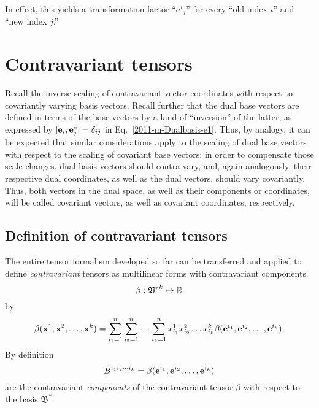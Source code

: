 In effect, this yields a transformation factor ``${a^i}_j$'' for every ``old index $i$'' and ``new index $j$.''



\section{Contravariant tensors}

Recall the inverse scaling of contravariant vector coordinates with respect to covariantly varying basis vectors.
Recall further that the dual base vectors are defined in terms of the base vectors by
a kind of ``inversion'' of the latter, as expressed by $[{\bf e}_i,  {\bf e}_j^*]=\delta_{ij}$
in Eq.~\ref{2011-m-Dualbasis-e1}.
Thus, by analogy, it can be expected that similar considerations apply to
the scaling of dual base vectors with respect to the scaling of covariant base vectors:
in order to compensate those scale changes, dual basis vectors should contra-vary,
and, again analogously,  their respective dual coordinates, as well as the dual vectors,
should vary covariantly.
Thus, both vectors in the dual space, as well as their components or coordinates, will be called covariant vectors,
as well as covariant coordinates, respectively.



\subsection{Definition of contravariant tensors}

The entire tensor formalism developed so far can be transferred and applied to define {\em contravariant} tensors
as multilinear forms with contravariant components
\begin{equation}
\beta:{ \frak V^\ast }^k \mapsto {\Bbb R}
\end{equation}
by
\begin{equation}
\beta ( {\bf x}^1,{\bf x}^2,\ldots ,{\bf x}^k)=
\sum_{i_1=1}^n
\sum_{i_2=1}^n
\cdots
\sum_{i_k=1}^n
x_{i_1}^1 x_{i_2}^2 \ldots x_{i_k}^k
\beta ( {\bf e}^{i_1},{\bf e}^{i_2},\ldots ,{\bf e}^{i_k}).
\end{equation}
By definition
\begin{equation}
B^{{i_1}{i_2}\cdots {i_k}}=\beta ( {\bf e}^{i_1},{\bf e}^{i_2},\ldots ,{\bf e}^{i_k})
\label{2011-m-tvtcontrav}
\end{equation}
 are the contravariant
{\em components} of the contravariant tensor $\beta $ with respect to the basis
${\mathfrak B}^\ast$.








